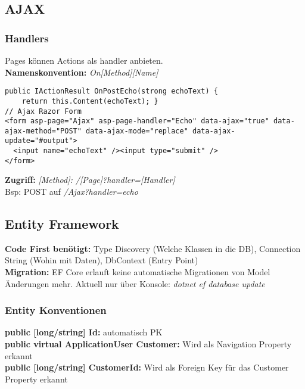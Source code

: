 \subsection{AJAX}

\subsubsection{Handlers}
Pages können Actions als handler anbieten.\\
\textbf{Namenskonvention:} \textit{On[Method][Name]}
\begin{lstlisting}[style=CSharp]
public IActionResult OnPostEcho(strong echoText) {
    return this.Content(echoText); }
// Ajax Razor Form
<form asp-page="Ajax" asp-page-handler="Echo" data-ajax="true" data-ajax-method="POST" data-ajax-mode="replace" data-ajax-update="#output">
  <input name="echoText" /><input type="submit" />
</form>
\end{lstlisting}
\textbf{Zugriff:} \textit{[Method]: /[Page]?handler=[Handler]}\\
Bsp: POST auf \textit{/Ajax?handler=echo}

\subsection{Entity Framework}
\textbf{Code First benötigt:} Type Discovery (Welche Klassen in die DB), Connection String (Wohin mit Daten), DbContext (Entry Point)\\
\textbf{Migration:} EF Core erlauft keine automatische Migrationen von Model Änderungen mehr. Aktuell nur über Konsole: \textit{dotnet ef database update}

\subsubsection{Entity Konventionen}
\textbf{public [long/string] Id:} automatisch PK\\
\textbf{public virtual ApplicationUser Customer:} Wird als Navigation Property erkannt\\
\textbf{public [long/string] CustomerId:} Wird als Foreign Key für das Customer Property erkannt

